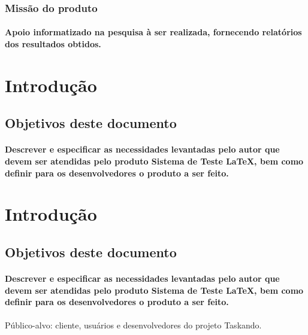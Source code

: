		\subsubsection{Missão do produto}
			\paragraph{Apoio informatizado na pesquisa à ser realizada, fornecendo relatórios dos resultados obtidos.}
			

\newpage

\section{Introdução}
	\subsection{Objetivos deste documento}
		\paragraph{Descrever e especificar as necessidades levantadas pelo autor que devem ser atendidas pelo produto Sistema de Teste LaTeX, bem como definir para os desenvolvedores o produto a ser feito.}

\newpage

\section{Introdução}
	\subsection{Objetivos deste documento}
		\paragraph{Descrever e especificar as necessidades levantadas pelo autor que devem ser atendidas pelo produto Sistema de Teste LaTeX, bem como definir para os desenvolvedores o produto a ser feito.}

\paragraph{}Público-alvo: cliente, usuários e desenvolvedores do projeto Taskando.

